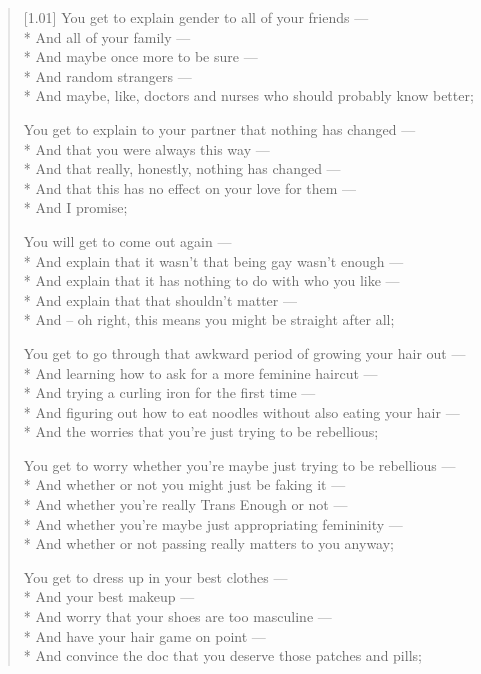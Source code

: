 \begin{verse}[1.01\textwidth]
  You get to explain gender to all of your friends ---\\*
  \vin And all of your family ---\\*
  \vin And maybe once more to be sure ---\\*
  \vin And random strangers ---\\*
  \vin And maybe, like, doctors and nurses who should probably know better;

  You get to explain to your partner that nothing has changed ---\\*
  \vin And that you were always this way ---\\*
  \vin And that really, honestly, nothing has changed ---\\*
  \vin And that this has no effect on your love for them ---\\*
  \vin And I promise;

  You will get to come out again ---\\*
  \vin And explain that it wasn't that being gay wasn't enough ---\\*
  \vin And explain that it has nothing to do with who you like ---\\*
  \vin And explain that that shouldn't matter ---\\*
  \vin And -- oh right, this means you might be straight after all;

  You get to go through that awkward period of growing your hair out ---\\*
  \vin And learning how to ask for a more feminine haircut ---\\*
  \vin And trying a curling iron for the first time ---\\*
  \vin And figuring out how to eat noodles without also eating your hair ---\\*
  \vin And the worries that you're just trying to be rebellious;

  You get to worry whether you're maybe just trying to be rebellious ---\\*
  \vin And whether or not you might just be faking it ---\\*
  \vin And whether you're really Trans Enough or not ---\\*
  \vin And whether you're maybe just appropriating femininity ---\\*
  \vin And whether or not passing really matters to you anyway;

  You get to dress up in your best clothes ---\\*
  \vin And your best makeup ---\\*
  \vin And worry that your shoes are too masculine ---\\*
  \vin And have your hair game on point ---\\*
  \vin And convince the doc that you deserve those patches and pills;


\end{verse}
